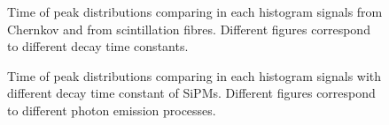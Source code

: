 \begin{figure}
	\centering
	 \quad
	\caption{Time of peak distributions comparing in each histogram signals from Chernkov and from scintillation fibres. Different figures correspond to different decay time constants.}
	\label{fig:top_per_tau}
\end{figure}

\begin{figure}
	\centering
	 \quad
	\caption{Time of peak distributions comparing in each histogram signals with different decay time constant of SiPMs. Different figures correspond to different photon emission processes.}
	\label{fig:top_per_fib}
\end{figure}

